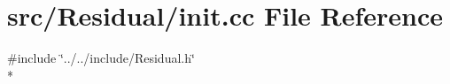 \section{src/\-Residual/init.cc File Reference}
\label{init_8cc}
{\ttfamily \#include \char`\"{}../../include/\-Residual.\-h\char`\"{}}\\*

